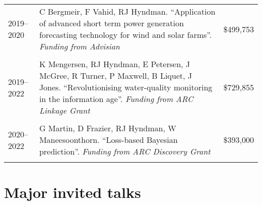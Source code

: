 \documentclass[10pt,a4paper,]{article}
\begin{document}
\begin{tabular}{lp{13.3cm}r}
   \\[-0.2cm]2019--2020 & C Bergmeir, F Vahid, RJ Hyndman. ``Application of advanced short term power generation forecasting technology for wind and solar farms''. \emph{Funding from Advisian} & \$499,753 \\ 
   \\[-0.2cm]2019--2022 & K Mengersen, RJ Hyndman, E Petersen, J McGree, R Turner, P Maxwell, B Liquet, J Jones. ``Revolutionising water-quality monitoring in the information age''. \emph{Funding from ARC Linkage Grant} & \$729,855 \\ 
   \\[-0.2cm]2020--2022 & G Martin, D Frazier, RJ Hyndman, W Maneesoonthorn. ``Loss-based Bayesian prediction''. \emph{Funding from ARC Discovery Grant} & \$393,000 \\ 
   \\[-0.2cm] \hline
\end{tabular}
\endgroup

\newpage

\hypertarget{major-invited-talks}{%
\section{Major invited talks}\label{major-invited-talks}}
\end{document}
